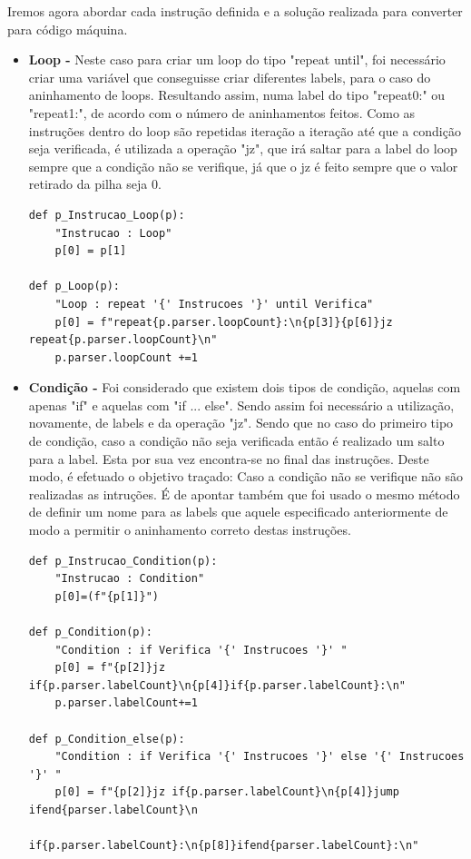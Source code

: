 \documentclass[11pt,a4paper]{report}
\begin{document}
Iremos agora abordar cada instrução definida e a solução realizada para converter para código máquina.
\begin{itemize}
\item \textbf{Loop -} Neste caso para criar um loop do tipo "repeat until", foi necessário criar uma variável que conseguisse criar diferentes labels, para o caso do aninhamento de loops. Resultando assim, numa label do tipo "repeat0:" ou "repeat1:", de acordo com o número de aninhamentos feitos. Como as instruções dentro do loop são repetidas iteração a iteração até que a condição seja verificada, é utilizada a operação "jz", que irá saltar para a label do loop sempre que a condição não se verifique, já que o jz é feito sempre que o valor retirado da pilha seja 0.

\begin {verbatim}
def p_Instrucao_Loop(p):
    "Instrucao : Loop"
    p[0] = p[1]

def p_Loop(p):
    "Loop : repeat '{' Instrucoes '}' until Verifica"
    p[0] = f"repeat{p.parser.loopCount}:\n{p[3]}{p[6]}jz repeat{p.parser.loopCount}\n"
    p.parser.loopCount +=1
\end{verbatim}


\item \textbf{Condição -} Foi considerado que existem dois tipos de condição, aquelas com apenas "if" e aquelas com "if ... else". Sendo assim foi necessário a utilização, novamente, de labels e da operação "jz". Sendo que no caso do primeiro tipo de condição, caso a condição não seja verificada então é realizado um salto para a label. Esta por sua vez encontra-se no final das instruções. Deste modo, é efetuado o objetivo traçado: Caso a condição não se verifique não são realizadas as intruções. É de apontar também que foi usado o mesmo método de definir um nome para as labels que aquele especificado anteriormente de modo a permitir o aninhamento correto destas instruções. 
\begin {verbatim}
def p_Instrucao_Condition(p):
    "Instrucao : Condition"
    p[0]=(f"{p[1]}")

def p_Condition(p):
    "Condition : if Verifica '{' Instrucoes '}' "
    p[0] = f"{p[2]}jz if{p.parser.labelCount}\n{p[4]}if{p.parser.labelCount}:\n"
    p.parser.labelCount+=1
    
def p_Condition_else(p):
    "Condition : if Verifica '{' Instrucoes '}' else '{' Instrucoes	'}' "
    p[0] = f"{p[2]}jz if{p.parser.labelCount}\n{p[4]}jump ifend{parser.labelCount}\n
				if{p.parser.labelCount}:\n{p[8]}ifend{parser.labelCount}:\n"


\end{verbatim}
\end{itemize}
\end{document}
